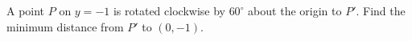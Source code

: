 A point $ P $ on $ y=-1 $ is rotated clockwise by $ 60^\circ $ about the origin to $ P'$. Find the minimum distance from $ P'$ to $(0,-1)$.
